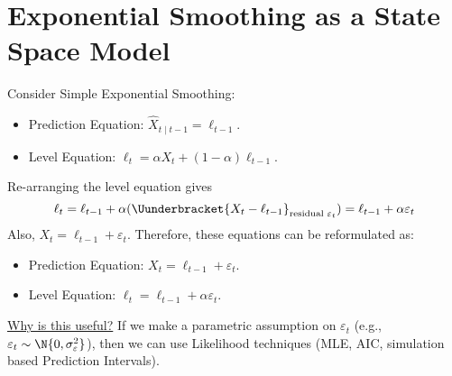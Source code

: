 \section{Exponential Smoothing as a State Space Model}
Consider Simple Exponential Smoothing:
\begin{itemize}
      \item Prediction Equation: $ \hat{X}_{t\mid t-1}=\ell_{t-1} $.
      \item Level Equation: $ \ell_t=\alpha X_t+(1-\alpha)\ell_{t-1} $.
\end{itemize}
Re-arranging the level equation gives
\[ \ell_t=\ell_{t-1}+\alpha(\Uunderbracket{X_t-\ell_{t-1}}_{\text{residual $ \varepsilon_t $}})=\ell_{t-1}+\alpha \varepsilon_t \]
Also, $ X_t=\ell_{t-1}+\varepsilon_t $. Therefore, these equations
can be reformulated as:
\begin{itemize}
      \item Prediction Equation: $ X_t=\ell_{t-1}+\varepsilon_t $.
      \item Level Equation: $ \ell_t=\ell_{t-1}+\alpha \varepsilon_t $.
\end{itemize}
\underline{Why is this useful?} If we make a parametric assumption
on $ \varepsilon_t $ (e.g., $ \varepsilon_t \sim \N{0,\sigma_{\varepsilon}^2} $),
then we can use Likelihood techniques (MLE, AIC, simulation based Prediction Intervals).

